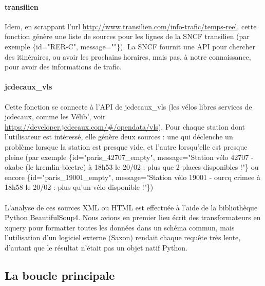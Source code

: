 \documentclass[a4paper, 12pt]{article}
\begin{document}
\paragraph{transilien} Idem, en scrappant l'url \url{http://www.transilien.com/info-trafic/temps-reel},
cette fonction génère une liste de sources pour les lignes de la SNCF transilien
(par exemple \{id="RER-C", message=""\}). %
La SNCF fournit une API pour chercher des itinéraires, ou avoir les prochains
horaires, mais pas, à notre connaissance, pour avoir des informations de trafic.

\paragraph{jcdecaux\_vls} Cette fonction se connecte à l'API de jcdecaux\_vls
(les vélos libres services de jcdecaux, comme les Vélib', voir
\url{https://developer.jcdecaux.com/#/opendata/vls}).
Pour chaque station dont l'utilisateur est intéressé, elle génère deux sources :
une qui déclenche un problème lorsque la station est presque vide, et l'autre
lorsqu'elle est presque pleine (par exemple \{id="paris\_42707\_empty",
message="Station vélo 42707 - okabe (le kremlin-bicetre) à 18h53 le 20/02 : plus
que 2 places disponibles !"\} ou encore \{id="paris\_19001\_empty", message="Station
vélo 19001 - ourcq crimee à 18h58 le 20/02 : plus qu'un vélo disponible !"\})

\paragraph{} L'analyse de ces sources XML ou HTML est effectuée à l'aide de la
bibliothèque Python BeautifulSoup4.
Nous avions en premier lieu écrit des transformateurs en xquery pour formatter
toutes les données dans un schéma commun, mais l'utilisation d'un logiciel
externe (Saxon) rendait chaque requête très lente, d'autant que le résultat
n'était pas un objet natif Python.

\subsection{La boucle principale}
\end{document}
